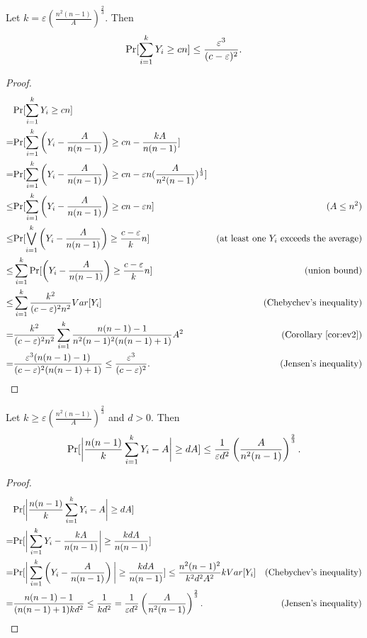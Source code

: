 \documentclass[10pt]{article}
\begin{document}
\begin{lemma}
\label{lem:3}
Let $k=\varepsilon (\frac{n^2(n-1)}{A})^{\frac{2}{3}}$. Then
$$\mathrm{Pr}[\sum_{i=1}^k Y_i \geq cn] \leq \frac{\varepsilon^3}{(c-\varepsilon)^2}.$$
\end{lemma}
\begin{proof}
$$
\begin{aligned}
&\mathrm{Pr}[\sum_{i=1}^k Y_i \geq cn] \\
= &\mathrm{Pr}[\sum_{i=1}^k \left( Y_i - \frac{A}{n(n-1)} \right) \geq cn-\frac{kA}{n(n-1)}] \\
= & \mathrm{Pr}[\sum_{i=1}^k \left( Y_i - \frac{A}{n(n-1)} \right) \geq cn-\varepsilon n(\frac{A}{n^2(n-1)})^{\frac{1}{3}}] \\
\leq & \mathrm{Pr}[\sum_{i=1}^k \left( Y_i - \frac{A}{n(n-1)} \right) \geq cn-\varepsilon n] &(A\leq n^2)\\
\leq & \mathrm{Pr}[\bigvee_{i=1}^k\left( Y_i - \frac{A}{n(n-1)} \right) \geq \frac{c-\varepsilon}{k}n] &\textrm{(at least one $Y_i$ exceeds the average)} \\
\leq & \sum_{i=1}^k \mathrm{Pr}[\left( Y_i - \frac{A}{n(n-1)} \right) \geq \frac{c-\varepsilon}{k}n] &\textrm{(union bound)} \\
\leq & \sum_{i=1}^k \frac{k^2}{(c-\varepsilon)^2n^2} Var[Y_i] &\textrm{(Chebychev's inequality)}\\
= & \frac{k^2}{(c-\varepsilon)^2n^2} \sum_{i=1}^k \frac{n(n-1)-1}{n^2(n-1)^2(n(n-1)+1)}A^2 &\textrm{(Corollary \ref{cor:ev2})} \\
= & \frac{\varepsilon^3 (n(n-1)-1)}{(c-\varepsilon)^2 (n(n-1)+1)} \leq \frac{\varepsilon^3}{(c-\varepsilon)^2}. & \textrm{(Jensen's inequality)}
\end{aligned}
$$
\end{proof}

\begin{lemma}
\label{lem:4}
Let $k\geq\varepsilon (\frac{n^2(n-1)}{A})^{\frac{2}{3}}$ and $d>0$. Then
$$\mathrm{Pr}[\bigg|\frac{n(n-1)}{k}\sum_{i=1}^k Y_i - A\bigg|\geq dA] \leq \frac{1}{\varepsilon d^2} \left(\frac{A}{n^2(n-1)}\right)^{\frac{2}{3}}.$$
\end{lemma}
\begin{proof}
$$
\begin{aligned}
&\mathrm{Pr}[\bigg|\frac{n(n-1)}{k}\sum_{i=1}^k Y_i - A\bigg|\geq dA]\\
= &\mathrm{Pr}[\bigg|\sum_{i=1}^k Y_i - \frac{kA}{n(n-1)}\bigg|\geq \frac{kdA}{n(n-1)}] \\
= &\mathrm{Pr}[\bigg|\sum_{i=1}^k \left( Y_i - \frac{A}{n(n-1)}\right) \bigg|\geq \frac{kdA}{n(n-1)}]
\leq \frac{n^2(n-1)^2}{k^2d^2A^2}k Var[Y_i] & \textrm{(Chebychev's inequality)}\\
= &\frac{n(n-1)-1}{(n(n-1)+1)kd^2} \leq \frac{1}{kd^2} = \frac{1}{\varepsilon d^2} \left(\frac{A}{n^2(n-1)}\right)^{\frac{2}{3}}. & \textrm{(Jensen's inequality)}
\end{aligned}
$$
\end{proof}
\end{document}
